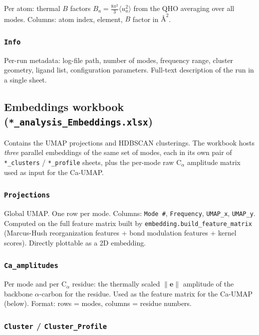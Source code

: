 \documentclass[11pt,a4paper,twoside]{article}
\providecommand{\angstrom}{\text{\AA}}    %
\newcommand{\evec}{\mathbf{e}}
\theoremstyle{remark}
\begin{document}
Per atom: thermal $B$ factors $B_a = \frac{8\pi^2}{3} \langle u_a^2
\rangle$ from the QHO averaging over all modes. Columns: atom
index, element, $B$ factor in $\angstrom^2$.

\subsubsection*{\texttt{Info}}

Per-run metadata: log-file path, number of modes, frequency
range, cluster geometry, ligand list, configuration parameters.
Full-text description of the run in a single sheet.

\subsection{Embeddings workbook (\texttt{*\_analysis\_Embeddings.xlsx})}
\label{app:wb-embeddings}

Contains the UMAP projections and HDBSCAN clusterings. The workbook
hosts \emph{three} parallel embeddings of the same set of modes,
each in its own pair of \texttt{*\_clusters} / \texttt{*\_profile}
sheets, plus the per-mode raw C$_\alpha$ amplitude matrix used as
input for the Ca-UMAP.

\subsubsection*{\texttt{Projections}}

Global UMAP. One row per mode. Columns: \texttt{Mode \#},
\texttt{Frequency}, \texttt{UMAP\_x}, \texttt{UMAP\_y}. Computed
on the full feature matrix built by
\texttt{embedding.build\_feature\_matrix} (Marcus-Hush reorganization
features + bond modulation features + kernel scores).
Directly plottable as a 2D embedding.

\subsubsection*{\texttt{Ca\_amplitudes}}

Per mode and per C$_\alpha$ residue: the thermally scaled
$\lVert\evec\rVert$ amplitude of the backbone $\alpha$-carbon for
the residue.  Used as the feature matrix for the Ca-UMAP
(below).  Format: rows = modes, columns = residue numbers.

\subsubsection*{\texttt{Cluster} / \texttt{Cluster\_Profile}}
\label{app:wb-embed-cluster}
\end{document}
